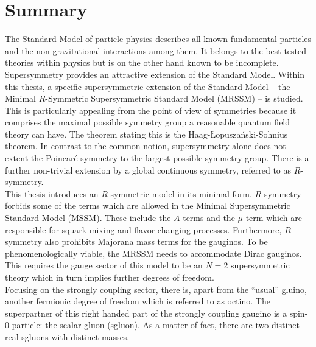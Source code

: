 \section{Summary}

The Standard Model of particle physics describes all known fundamental particles and the non-gravitational interactions among them. It belongs to the best tested theories within physics but is on the other hand known to be incomplete.\\
Supersymmetry provides an attractive extension of the Standard Model. Within this thesis, a specific supersymmetric extension of the Standard Model -- the Minimal $R$-Symmetric Supersymmetric Standard Model (MRSSM) -- is studied. This is particularly appealing from the point of view of symmetries because it comprises the maximal possible symmetry group a reasonable quantum field theory can have. The theorem stating this is the Haag-{\L}opusza\'nski-Sohnius theorem. In contrast to the common notion, supersymmetry alone does not extent the Poincaré symmetry to the largest possible symmetry group. There is a further non-trivial extension by a global continuous symmetry, referred to as $R$-symmetry.\\
This thesis introduces an $R$-symmetric model in its minimal form. $R$-symmetry forbids some of the terms which are allowed in the Minimal Supersymmetric Standard Model (MSSM). These include the $A$-terms and the $\mu$-term which are responsible for squark mixing and flavor changing processes. Furthermore, $R$-symmetry also prohibits Majorana mass terms for the gauginos. To be phenomenologically viable, the MRSSM needs to accommodate Dirac gauginos. This requires the gauge sector of this model to be an $N=2$ supersymmetric theory which in turn implies further degrees of freedom.\\
Focusing on the strongly coupling sector, there is, apart from the ``usual'' gluino, another fermionic degree of freedom which is referred to as octino. The superpartner of this right handed part of the strongly coupling gaugino is a spin-0 particle: the scalar gluon (sgluon). As a matter of fact, there are two distinct real sgluons with distinct masses.\\ 
